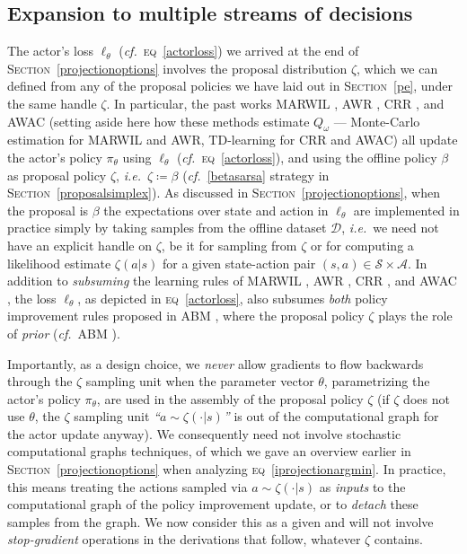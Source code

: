 \subsection{Expansion to multiple streams of decisions}
\label{multisteams}
The actor's loss $\ell_\theta$ (\textit{cf.}~\textsc{eq}~\ref{actorloss})
we arrived at the end of \textsc{Section}~\ref{projectionoptions}
involves the proposal distribution $\zeta$,
which we can defined from any of the proposal policies we have laid out in \textsc{Section}~\ref{pe}, under
the same handle $\zeta$.
In particular, the past works
MARWIL \cite{Wang2018-dn},
AWR \cite{Peng2019-hu},
CRR \cite{Wang2020-sr},
and AWAC \cite{Nair2020-gd}
(setting aside here how these methods estimate $Q_\omega$ --- Monte-Carlo estimation for MARWIL and AWR,
TD-learning for CRR and AWAC)
all update the actor's policy $\pi_\theta$ using $\ell_\theta$ (\textit{cf.}~\textsc{eq}~\ref{actorloss}),
and using the offline policy $\beta$ as proposal policy $\zeta$, \textit{i.e.}~$\zeta \coloneqq \beta$
(\textit{cf.}~\ref{betasarsa} strategy in \textsc{Section}~\ref{proposalsimplex}).
As discussed in \textsc{Section}~\ref{projectionoptions}, when the proposal is $\beta$ the expectations
over state and action in $\ell_\theta$ are implemented in practice simply by taking samples from the offline
dataset $\mathcal{D}$, \textit{i.e.}~we need not have an explicit handle on $\zeta$, be it for sampling from $\zeta$
or for computing a likelihood estimate $\zeta(a | s)$ for a given state-action pair
$(s,a) \in \mathcal{S} \times \mathcal{A}$.
In addition to \emph{subsuming} the learning rules of
MARWIL \cite{Wang2018-dn},
AWR \cite{Peng2019-hu},
CRR \cite{Wang2020-sr},
and AWAC \cite{Nair2020-gd},
the loss $\ell_\theta$, as depicted in \textsc{eq}~\ref{actorloss},
also subsumes \emph{both} policy improvement rules proposed in
ABM \cite{Siegel2020-lo},
where the proposal policy $\zeta$ plays the role of \emph{prior} (\textit{cf.}~ABM \cite{Siegel2020-lo}).

Importantly, as a design choice, we \emph{never} allow gradients to flow backwards through the $\zeta$ sampling unit
when the parameter vector $\theta$, parametrizing the actor's policy $\pi_\theta$, are used in the assembly of
the proposal policy $\zeta$ (if $\zeta$ does not use $\theta$, the $\zeta$ sampling unit
\textit{``$a \sim \zeta(\cdot | s)$''} is out of the computational graph for the actor update anyway).
We consequently need not involve stochastic computational graphs techniques, of which we gave an overview
earlier in \textsc{Section}~\ref{projectionoptions} when analyzing \textsc{eq}~\ref{iprojectionargmin}.
In practice, this means treating the actions sampled via $a \sim \zeta(\cdot | s)$ as \textit{inputs}
to the computational graph of the policy improvement update, or to \textit{detach} these samples from the graph.
We now consider this as a given and
will not involve \textit{stop-gradient} operations in the derivations that follow, whatever $\zeta$ contains.

